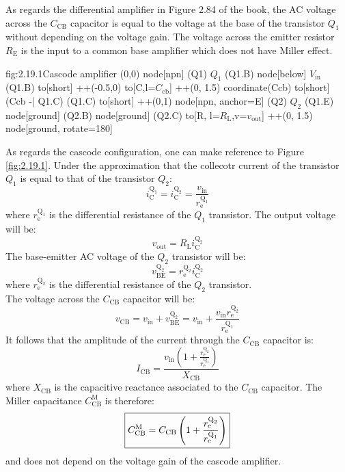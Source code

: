 As regards the differential amplifier in Figure 2.84 of the book, the AC voltage across the $C_{\text{CB}}$ capacitor is equal to the voltage at the base of the transistor $Q_1$ without depending on the voltage gain. The voltage across the emitter resistor $R_\text{E}$ is the input to a common base amplifier which does not have Miller effect.\\
\begin{circuit}{fig:2.19.1}{Cascode amplifier}
    (0,0) node[npn] (Q1) {$Q_1$}
    (Q1.B) node[below] {$V_\text{in}$}
    (Q1.B) to[short] ++(-0.5,0)
    to[C,l=$C_\text{cb}$] ++(0, 1.5) coordinate(Ccb)
    to[short] (Ccb -| Q1.C)
    (Q1.C) to[short] ++(0,1)
    node[npn, anchor=E] (Q2) {$Q_2$}
    (Q1.E) node[ground] {}
    (Q2.B) node[ground] {}
    (Q2.C) to[R, l=$R_\text{L}$,v=$v_{\text{out}}$] ++(0, 1.5)
    node[ground, rotate=180] {}
\end{circuit}
As regards the cascode configuration, one can make reference to Figure \ref{fig:2.19.1}. Under the approximation that the collecotr current of the transistor $Q_1$ is equal to that of the transistor $Q_2$:
\[i_\text{C}^{\text{Q}_1} = i_\text{C}^{\text{Q}_2} = \frac{v_\text{in}}{r_\text{e}^{\text{Q}_1}}\]
where $r_\text{e}^{\text{Q}_1}$ is the differential resistance of the $Q_1$ transistor.
The output voltage will be:
\[v_\text{out}=R_\text{L}i_\text{C}^{\text{Q}_2}\]
The base-emitter AC voltage of the $Q_2$ transistor will be:
\[v_{\text{BE}}^{\text{Q}_2}=r_\text{e}^{\text{Q}_2}i_\text{C}^{\text{Q}_2}\]
where $r_\text{e}^{\text{Q}_2}$ is the differential resistance of the $Q_2$ transistor.\\
The voltage across the $C_\text{CB}$ capacitor will be:
\[v_\text{CB}=v_\text{in}+v_{\text{BE}}^{\text{Q}_2}=v_\text{in}+\frac{v_\text{in}r_\text{e}^{\text{Q}_2}}{r_\text{e}^{\text{Q}_1}}\]
It follows that the amplitude of the current through the $C_\text{CB}$ capacitor is:
\[I_\text{CB}=\frac{v_\text{in}\left(1+\frac{r_\text{e}^{\text{Q}_2}}{r_\text{e}^{\text{Q}_1}}\right)}{X_\text{CB}}\]
where $X_\text{CB}$ is the capacitive reactance associated to the $C_\text{CB}$ capacitor.
The Miller capacitance $C_\text{CB}^\text{M}$ is therefore:
\[\boxed{C_\text{CB}^\text{M}=C_\text{CB}\left(1+\frac{r_\text{e}^{\text{Q}_2}}{r_\text{e}^{\text{Q}_1}}\right)}\]
and does not depend on the voltage gain of the cascode amplifier.

